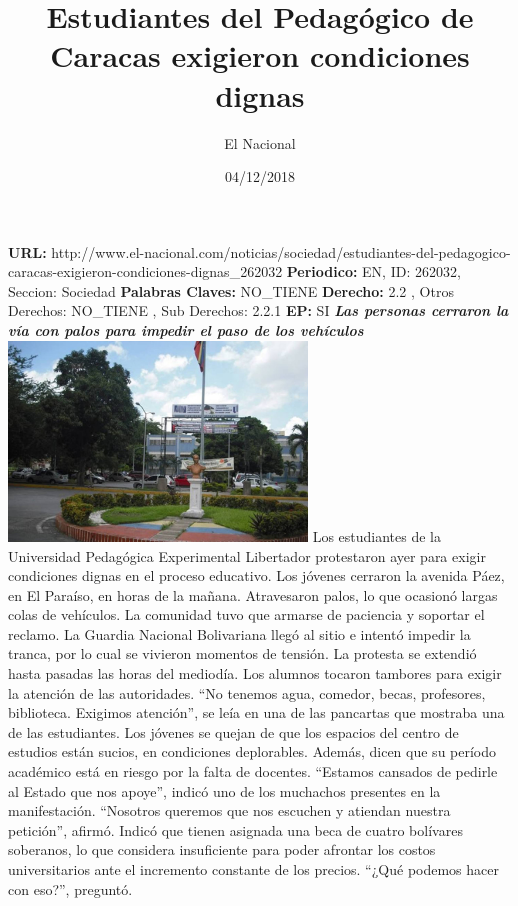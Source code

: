 \documentclass{article}%
\title{\textbf{Estudiantes del Pedagógico de Caracas exigieron condiciones dignas}}%
\author{El Nacional}%
\date{04/12/2018}%
\begin{document}
%
\normalsize%
\maketitle%
\textbf{URL: }%
http://www.el{-}nacional.com/noticias/sociedad/estudiantes{-}del{-}pedagogico{-}caracas{-}exigieron{-}condiciones{-}dignas\_262032\newline%
%
\textbf{Periodico: }%
EN, %
ID: %
262032, %
Seccion: %
Sociedad\newline%
%
\textbf{Palabras Claves: }%
NO\_TIENE\newline%
%
\textbf{Derecho: }%
2.2%
, Otros Derechos: %
NO\_TIENE%
, Sub Derechos: %
2.2.1%
\newline%
%
\textbf{EP: }%
SI\newline%
\newline%
%
\textbf{\textit{Las personas cerraron la vía con palos para impedir el paso de los vehículos}}%
\newline%
\newline%
%
\includegraphics[width=300px]{65.jpg}%
\newline%
%
Los estudiantes de la Universidad Pedagógica Experimental Libertador protestaron ayer para exigir condiciones dignas en el proceso educativo.%
\newline%
%
Los jóvenes cerraron la avenida Páez, en El Paraíso, en horas de la mañana. Atravesaron palos, lo que ocasionó largas colas de vehículos. La comunidad tuvo que armarse de paciencia y soportar el reclamo. La Guardia Nacional Bolivariana llegó al sitio e intentó impedir la tranca, por lo cual se vivieron momentos de tensión.%
\newline%
%
La protesta se extendió hasta pasadas las horas del mediodía. Los alumnos tocaron tambores para exigir la atención de las autoridades.%
\newline%
%
“No tenemos agua, comedor, becas, profesores, biblioteca. Exigimos atención”, se leía en una de las pancartas que mostraba una de las estudiantes.%
\newline%
%
Los jóvenes se quejan de que los espacios del centro de estudios están sucios, en condiciones deplorables. Además, dicen que su período académico está en riesgo por la falta de docentes.%
\newline%
%
“Estamos cansados de pedirle al Estado que nos apoye”, indicó uno de los muchachos presentes en la manifestación. “Nosotros queremos que nos escuchen y atiendan nuestra petición”, afirmó.%
\newline%
%
Indicó que tienen asignada una beca de cuatro bolívares soberanos, lo que considera insuficiente para poder afrontar los costos universitarios ante el incremento constante de los precios. “¿Qué podemos hacer con eso?”, preguntó.%
\newline%
%
\end{document}
